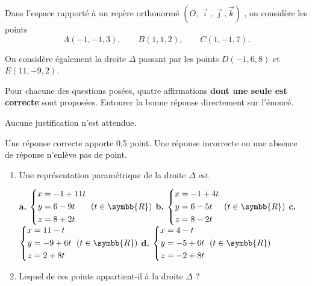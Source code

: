 \documentclass[french,no-indent,FontSize=11pt]{tango}
\begin{document}
Dans l'espace rapporté à un repère orthonormé $(O,\vec\imath,\vec\jmath,\vec k)$ , on considère les points
\[A(-1,-1,3),\qquad B(1,1,2),\qquad  C(1,-1,7).\]

On considère également la droite $\Delta$ passant par les points $D(-1,6,8)$ et $E(11,- 9,2)$.

Pour chacune des questions posées, quatre affirmations \textbf{dont une seule est correcte} sont proposées.
Entourer la bonne réponse directement sur l'énoncé.

Aucune justification n'est attendue.

Une réponse correcte apporte 0,5 point. Une réponse incorrecte ou une absence de réponse n'enlève pas de point.  


	\begin{enumerate}
		\item Une représentation paramétrique de la droite $\Delta$ est 
\medskip
			
\textbf{a.} $\left\{
		\begin{aligned}
		x&= -1 + 11t\\
		y&= 6 - 9t\\
		z&= 8 +2t\\
		\end{aligned} \right.~(t \in \symbb{R})$
		 \hfill
\textbf{b.} $\left\{
		\begin{aligned}
		x&= -1 + 4t\\
		y&= 6 - 5t\\
		z&= 8 -2t\\
		\end{aligned} \right.~(t \in \symbb{R})$
		\hfill 
\textbf{c.} $\left\{
		\begin{aligned}
		x&= 11 -t\\
		y&= - 9+6t\\
		z&= 2 +8t\\
		\end{aligned} \right.~(t \in \symbb{R})$
		\hfill
 \textbf{d.}
		$\left\{
		\begin{aligned}
		x&= 4 -t\\
		y&= -5 +6t\\
		z&= -2 + 8 t\\
		\end{aligned} \right.~(t \in \symbb{R})$\hfill\null

\bigskip		
		
		\item Lequel de ces points appartient-il à  la droite $\Delta$ ?

\medskip
		

\end{enumerate}
\end{document}
